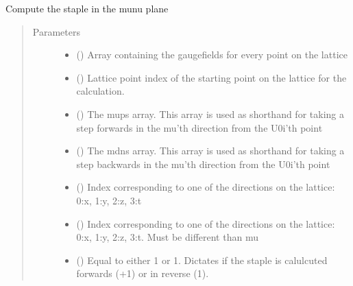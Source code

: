 \documentclass[letterpaper,10pt,english]{sphinxmanual}
\begin{document}
\begin{fulllineitems}
\label{\detokenize{index:su2.staple}}
Compute the staple in the mu\sphinxhyphen{}nu plane
\begin{quote}\begin{description}
\item[{Parameters}] \leavevmode\begin{itemize}
\item {} 
 () \textendash{} Array containing the gaugefields for every point on the lattice

\item {} 
 () \textendash{} Lattice point index of the starting point on the lattice for
the calculation.

\item {} 
 () \textendash{} The mups array. This array is used as shorthand for taking a
step forwards in the mu’th direction from the U0i’th point

\item {} 
 () \textendash{} The mdns array. This array is used as shorthand for taking a
step backwards in the mu’th direction from the U0i’th point

\item {} 
 () \textendash{} Index corresponding to one of the directions on the lattice:
0:x, 1:y, 2:z, 3:t

\item {} 
 () \textendash{} Index corresponding to one of the directions on the lattice:
0:x, 1:y, 2:z, 3:t. Must be different than mu

\item {} 
 () \textendash{} Equal to either 1 or \sphinxhyphen{}1. Dictates if the staple is calulcuted
forwards (+1) or in reverse (\sphinxhyphen{}1).


\end{itemize}
\end{description}
\end{quote}
\end{fulllineitems}
\end{document}
